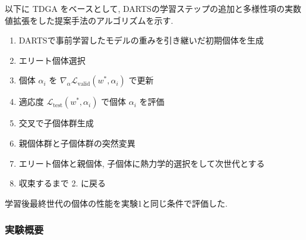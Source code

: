 以下に TDGA をベースとして, DARTSの学習ステップの追加と多様性項の実数値拡張をした提案手法のアルゴリズムを示す.



\begin{enumerate}
  \item DARTSで事前学習したモデルの重みを引き継いだ初期個体を生成
  \item エリート個体選択
  \item 個体 $\alpha_i$ を $\displaystyle \nabla_\alpha \mathcal{L}_{\mathrm{valid}}(w^*, \alpha_i)$ で更新
  \item 適応度 $\displaystyle \mathcal{L}_{\mathrm{test}}(w^*, \alpha_i)$ で個体 $\alpha_i$ を評価
  \item 交叉で子個体群生成
  \item 親個体群と子個体群の突然変異
  \item エリート個体と親個体, 子個体に熱力学的選択をして次世代とする
  \item 収束するまで 2. に戻る
\end{enumerate}


学習後最終世代の個体の性能を実験1と同じ条件で評価した.


\changeindent{0cm}
\subsubsection{実験概要}
\label{sec:pred.02_03}
\changeindent{2cm}


